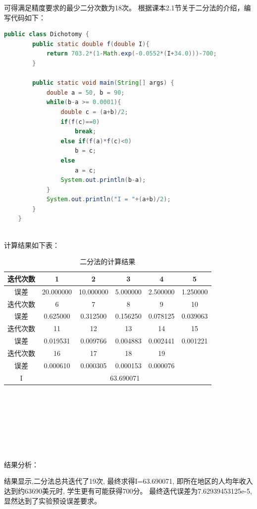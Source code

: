 \documentclass[12pt,a4paper]{article}
\begin{document}
可得满足精度要求的最少二分次数为18次。
根据课本2.1节关于二分法的介绍，编写代码如下：
\begin{lstlisting}[language={java}]
    public class Dichotomy {
        public static double f(double I){
            return 703.2*(1-Math.exp(-0.0552*(I+34.0)))-700;
        }
    
        public static void main(String[] args) {
            double a = 50, b = 90;
            while(b-a >= 0.0001){
                double c = (a+b)/2;
                if(f(c)==0)
                    break;
                else if(f(a)*f(c)<0)
                    b = c;
                else
                    a = c;
                System.out.println(b-a);
            }
            System.out.println("I = "+(a+b)/2);
        }
    }
\end{lstlisting}
~\\
计算结果如下表：
\begin{table}[ht]
    \centering
    \begin{tabular}{|c|c|c|c|c|c|} 
     \hline
     迭代次数 & 1 & 2 & 3 & 4 & 5 \\ [0.5ex] 
     \hline
     误差 & 20.000000 & 10.000000 & 5.000000 & 2.500000 & 1.250000 \\ 
     \hline
     迭代次数 & 6 & 7 & 8 & 9 & 10 \\
     \hline
     误差 & 0.625000 & 0.312500 & 0.156250 & 0.078125 & 0.039063 \\
     \hline
     迭代次数 & 11 & 12 & 13 & 14 & 15 \\
     \hline
     误差 & 0.019531 & 0.009766 & 0.004883 & 0.002441 & 0.001221 \\
     \hline
     迭代次数 & 16 & 17 & 18 & 19 & \\
     \hline
     误差 & 0.000610 & 0.000305 & 0.000153 & 0.000076 & \\
     \hline
     I & \multicolumn{5}{c|}{63.690071} \\
     \hline
    \end{tabular}
    \caption{二分法的计算结果}
    \label{table:1}
\end{table}
    ~\\~\\~\\~\\~\\~\\~\\
    结果分析：

    结果显示,二分法总共迭代了19次,
    最终求得I=63.690071,
    即所在地区的人均年收入达到约63690美元时,
    学生更有可能获得700分。
    最终迭代误差为7.62939453125e-5,
    显然达到了实验预设误差要求。
\end{document}
